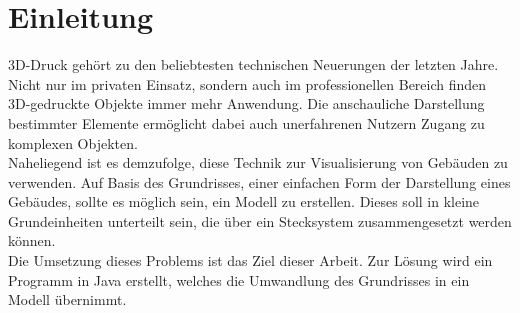 \chapter{Einleitung}
3D-Druck gehört zu den beliebtesten technischen Neuerungen der letzten Jahre.
Nicht nur im privaten Einsatz, sondern auch im professionellen Bereich finden 3D-gedruckte Objekte immer mehr Anwendung.
Die anschauliche Darstellung bestimmter Elemente ermöglicht dabei auch unerfahrenen Nutzern Zugang zu komplexen Objekten. \\

Naheliegend ist es demzufolge, diese Technik zur Visualisierung von Gebäuden zu verwenden.
Auf Basis des Grundrisses, einer einfachen Form der Darstellung eines Gebäudes, sollte es möglich sein, ein Modell zu erstellen.
Dieses soll in kleine Grundeinheiten unterteilt sein, die über ein Stecksystem zusammengesetzt werden können. \\

Die Umsetzung dieses Problems ist das Ziel dieser Arbeit.
Zur Lösung wird ein Programm in Java erstellt, welches die Umwandlung des Grundrisses in ein Modell übernimmt.

%
%
%
